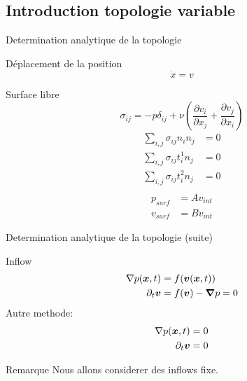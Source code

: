 \subsection{Introduction topologie variable}
\begin{frame}{Determination analytique de la topologie}

\begin{block}{Déplacement de la position}
 \begin{equation*}
  \dot{x}=v
 \end{equation*}
\end{block}

\begin{block}{Surface libre}
\begin{equation*}
	\sigma_{ij}=-p \delta_{ij}+\nu\left(\frac{\partial v_{i}}{\partial x_{j}}+\frac{\partial v_{j}}{\partial x_{i}}\right)
\end{equation*}
 \begin{align*}
	\sum_{i,j}\sigma_{ij}n_{i}n_{j}&=0\\
	\sum_{i,j}\sigma_{ij}t^{1}_{i}n_{j}&=0\\
	\sum_{i,j}\sigma_{ij}t^{2}_{i}n_{j}&=0\\
\end{align*}
\begin{align*}
 p_{surf}&=Av_{int}\\
 v_{surf}&=Bv_{int}
\end{align*}

\end{block}
 
\end{frame}

\begin{frame}{Determination analytique de la topologie (suite)}
 \begin{block}{Inflow}
 \begin{align*}
\nabla p({\boldsymbol {x}},t)&=f({\boldsymbol {v}}({\boldsymbol {x}},t))\\
\partial_t {\boldsymbol {v}}&=f({\boldsymbol {v}})-{\boldsymbol {\nabla}}p=0
\end{align*}
Autre methode:
\begin{align*}
 \nabla p({\boldsymbol {x}},t)&=0\\
 \partial_t {\boldsymbol {v}}&=0
\end{align*}

\end{block}
\begin{block}{Remarque}
Nous allons considerer des inflows fixe.
\end{block}

\end{frame}
